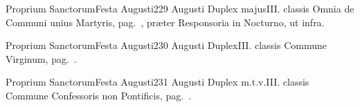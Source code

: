 \documentclass[nocturnale-romanum.tex]{subfiles}
\begin{document}
	{Proprium Sanctorum}{Festa Augusti}{2}{29 Augusti}
	{Duplex majus}{III. classis}
	{Omnia de Communi unius Martyris, pag.\ \pageref{M-UMEX}, præter Responsoria in  Nocturno, ut infra.}
	{}
\tedeumrubric

	{Proprium Sanctorum}{Festa Augusti}{2}{30 Augusti}
	{Duplex}{III. classis}
	{Commune Virginum, pag.\ \pageref{M-MU}.}
	{}

	{Proprium Sanctorum}{Festa Augusti}{2}{31 Augusti}
	{Duplex m.t.v.}{III. classis}
	{Commune Confessoris non Pontificis, pag.\ \pageref{M-CONP}.}
	{}
\end{document}
